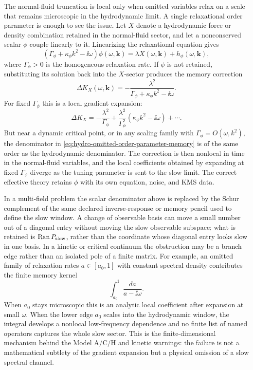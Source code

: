 The normal-fluid truncation is local only when omitted variables relax on a
scale that remains microscopic in the hydrodynamic limit.  A single
relaxational order parameter is enough to see the issue.  Let \(X\) denote a
hydrodynamic force or density combination retained in the normal-fluid sector,
and let a nonconserved scalar \(\phi\) couple linearly to it.  Linearizing the
relaxational equation gives
\begin{equation}
  \left(\Gamma_\phi+\kappa_\phi k^2-\ii\omega\right)\phi(\omega,\mathbf k)
  =
  \lambda X(\omega,\mathbf k)+h_\phi(\omega,\mathbf k),
  \label{eq:hydro-relaxing-order-parameter-equation}
\end{equation}
where \(\Gamma_\phi>0\) is the homogeneous relaxation rate.  If \(\phi\) is
not retained, substituting its solution back into the \(X\)-sector produces
the memory correction
\begin{equation}
  \Delta K_X(\omega,\mathbf k)
  =
  -\frac{\lambda^2}
  {\Gamma_\phi+\kappa_\phi k^2-\ii\omega}.
  \label{eq:hydro-omitted-order-parameter-memory}
\end{equation}
For fixed \(\Gamma_\phi\) this is a local gradient expansion:
\[
  \Delta K_X
  =
  -\frac{\lambda^2}{\Gamma_\phi}
  +\frac{\lambda^2}{\Gamma_\phi^2}
  (\kappa_\phi k^2-\ii\omega)
  +\cdots .
\]
But near a dynamic critical point, or in any scaling family with
\(\Gamma_\phi=O(\omega,k^2)\), the denominator in
\eqref{eq:hydro-omitted-order-parameter-memory} is of the same order as the
hydrodynamic denominator.  The correction is then nonlocal in time in the
normal-fluid variables, and the local coefficients obtained by expanding at
fixed \(\Gamma_\phi\) diverge as the tuning parameter is sent to the slow
limit.  The correct effective theory retains \(\phi\) with its own equation,
noise, and KMS data.

In a multi-field problem the scalar denominator above is replaced by the
Schur complement of the same declared inverse-response or memory pencil used
to define the slow window.  A change of observable basis can move a small
number out of a diagonal entry without moving the slow observable subspace;
what is retained is \(\operatorname{Ran}P_{\rm slow}\), rather than the
coordinate whose diagonal entry looks slow in one basis.  In a kinetic or
critical continuum the obstruction may be a branch edge rather than an
isolated pole of a finite matrix.  For example, an omitted
family of relaxation rates \(a\in[a_0,1]\) with constant spectral density
contributes the finite memory kernel
\[
  \int_{a_0}^{1}\frac{da}{a-\ii\omega}.
\]
When \(a_0\) stays microscopic this is an analytic local coefficient after
expansion at small \(\omega\).  When the lower edge \(a_0\) scales into the
hydrodynamic window, the integral develops a nonlocal low-frequency
dependence and no finite list of named operators captures the whole slow
sector.  This is the finite-dimensional mechanism behind the Model A/C/H and
kinetic warnings: the failure is not a mathematical subtlety of the gradient
expansion but a physical omission of a slow spectral channel.

